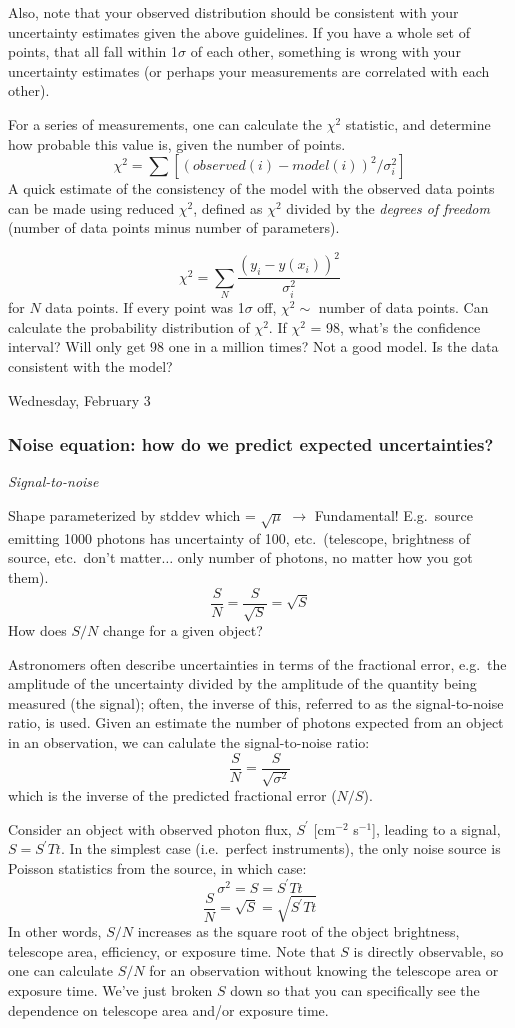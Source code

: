 \documentclass[12pt]{article}
\begin{document}
Also, note that your observed distribution should be
consistent with your uncertainty estimates given the above guidelines.
If you have a whole set of points, that all fall within 1$\sigma$ of
each other, something is wrong with your uncertainty estimates (or
perhaps your measurements are correlated with each other).

For a series of measurements, one can calculate the
$\chi^{2}$ statistic, and determine how probable this value is,
given the number of points.
    $$ \chi^{2} = \sum [(observed(i)-model(i))^{2}/\sigma_i^{2}]  $$
A quick estimate of the consistency of the model with the observed
data points can be made using reduced $\chi^{2}$, defined as
$\chi^{2}$ divided by the \emph{degrees of freedom} (number of data points
minus number of parameters).

\textcolor{myBlue}{%
    $$  \chi^{2} = \sum_N \frac{(y_i-y(x_i))^{2}}{\sigma_i^{2}} $$
for $N$ data points. If every point was 1$\sigma$ off,
$\chi^{2} \sim$ number of data points. Can calculate the probability
distribution of $\chi^{2}$. If $\chi^{2}$ = 98, what's the confidence
interval? Will only get 98 one in a million times? Not a good model.
Is the data consistent with the model?
}

\textcolor{date}{Wednesday, February 3}
\subsubsection{Noise equation: how do we predict expected
uncertainties?}
\emph{Signal-to-noise}

\textcolor{myBlue}{%
Shape parameterized by stddev which = $\sqrt{\mu}$
$\rightarrow$ Fundamental! E.g.\ source emitting 1000 photons has
uncertainty of 100, etc.\ (telescope, brightness of source, etc.\ don't
matter$\ldots$ only number of photons, no matter how you got them).
    $$ \frac{S}{N} = \frac{S}{\sqrt{S}} = \sqrt{S} $$
How does $S/N$ change for a given object?
}

Astronomers often describe uncertainties in terms of the fractional
error, e.g.\ the amplitude of the uncertainty divided by the amplitude
of the quantity being measured (the signal);
often, the inverse of this, referred
to as the signal-to-noise ratio, is used. Given an estimate the number
of photons expected from an object in an observation, we can calulate
the signal-to-noise ratio:
    $$ \frac{S}{N} = \frac{S}{\sqrt{\sigma^{2}}} $$
which is the inverse of the predicted fractional error ($N/S$).

Consider an object with observed photon flux, $S^{\prime}$
[cm$^{-2}$ s$^{-1}$],
leading to a signal, $S = S^{\prime}Tt$.
In the simplest case (i.e.\ perfect
instruments), the only noise
source is Poisson statistics from the source, in which case:
    $$ \sigma^{2} = S = S^{\prime}Tt $$
    $$ \frac{S}{N} = \sqrt{S} = \sqrt{S^{\prime}Tt} $$
In other words, $S/N$ increases as the square root of the object
brightness, telescope area, efficiency, or exposure time. Note that $S$
is directly observable, so one can calculate $S/N$ for an
observation without knowing the telescope area or exposure time.
We've just broken $S$ down so that you can specifically see the dependence on
telescope area and/or exposure time.
\end{document}
